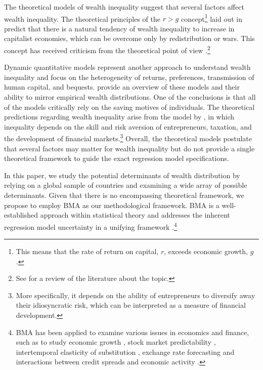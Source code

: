 \documentclass[a4paper,11pt]{article}
\begin{document}
The theoretical models of wealth inequality suggest that several factors affect wealth inequality. The theoretical principles of the $r > g$ concept\footnote{This means that the rate of return on capital, $r$, exceeds economic growth, $g$.} laid out in \citet{piketty2014} predict that there is a natural tendency of wealth inequality to increase in capitalist economies, which can be overcome only by redistribution or wars. This concept has received criticism from the theoretical point of view \citep{blume2015capital,mankiw2015yes}.\footnote{See \citet{king2017literature} for a review of the literature about the topic.} 

Dynamic quantitative models represent another approach to understand wealth inequality and focus on the heterogeneity of returns, preferences, transmission of human capital, and bequests. \citet{DENARDI2017280} provide an overview of these models and their ability to mirror empirical wealth distributions. One of the conclusions is that all of the models critically rely on the saving motives of individuals. The theoretical predictions regarding wealth inequality arise from the model by \citet{pastor2016income}, in which inequality depends on the skill and risk aversion of entrepreneurs, taxation, and the development of financial markets.\footnote{More specifically, it depends on the ability of entrepreneurs to diversify away their idiosyncratic risk, which can be interpreted as a measure of financial development.} Overall, the theoretical models postulate that several factors may matter for wealth inequality but do not provide a single theoretical framework to guide the exact regression model specifications. 

In this paper, we study the potential determinants of wealth distribution by relying on a global sample of countries and examining a wide array of possible determinants. Given that there is no encompassing theoretical framework, we propose to employ \ac{BMA} as our methodological framework. \ac{BMA} is a well-established approach within statistical theory and addresses the inherent regression model uncertainty in a unifying framework \citep{Koopetal2007,Rafteryetal1997}.\footnote{\ac{BMA} has been applied to examine various issues in economics and finance, such as to study economic growth \citep{Durlaufetal2008,Fernandezetal2001}, stock market predictability  \citep{avramov,cremers}, intertemporal elasticity of substitution \citep{Havraneketal2015}, exchange rate forecasting \citep{wright} and interactions between credit spreads and economic activity \citep{faust2013}.} 
\end{document}
